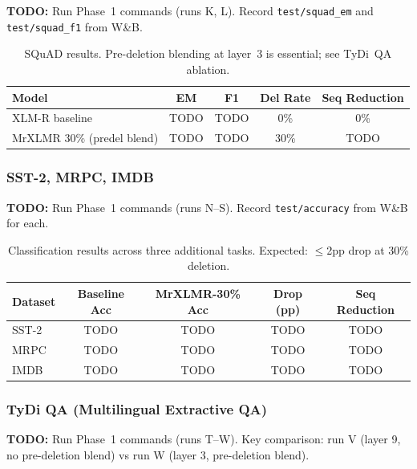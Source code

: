\documentclass[11pt,a4paper]{article}
\newcommand{\todo}[1]{\begin{mdframed}[style=todostyle]\textcolor{todocolor}{\textbf{TODO:}} #1\end{mdframed}}
\begin{document}
\todo{Run Phase~1 commands (runs K, L). Record \texttt{test/squad\_em} and \texttt{test/squad\_f1} from W\&B.}

\begin{table}[h]
\centering
\begin{tabular}{@{}lcccc@{}}
\toprule
\textbf{Model} & \textbf{EM} & \textbf{F1} & \textbf{Del Rate} & \textbf{Seq Reduction} \\
\midrule
XLM-R baseline                & TODO & TODO & 0\%  & 0\% \\
MrXLMR 30\% (predel blend)   & TODO & TODO & 30\% & TODO \\
\bottomrule
\end{tabular}
\caption{SQuAD results. Pre-deletion blending at layer~3 is essential; see TyDi~QA ablation.}
\label{tab:squad-results}
\end{table}

\subsubsection{SST-2, MRPC, IMDB}

\todo{Run Phase~1 commands (runs N--S). Record \texttt{test/accuracy} from W\&B for each.}

\begin{table}[h]
\centering
\begin{tabular}{@{}lcccc@{}}
\toprule
\textbf{Dataset} & \textbf{Baseline Acc} & \textbf{MrXLMR-30\% Acc} & \textbf{Drop (pp)} & \textbf{Seq Reduction} \\
\midrule
SST-2 & TODO & TODO & TODO & TODO \\
MRPC  & TODO & TODO & TODO & TODO \\
IMDB  & TODO & TODO & TODO & TODO \\
\bottomrule
\end{tabular}
\caption{Classification results across three additional tasks. Expected: $\leq$2pp drop at 30\% deletion.}
\label{tab:classification-results}
\end{table}

\subsubsection{TyDi QA (Multilingual Extractive QA)}

\todo{Run Phase~1 commands (runs T--W). Key comparison: run V (layer 9, no pre-deletion blend) vs run W (layer 3, pre-deletion blend).}
\end{document}
